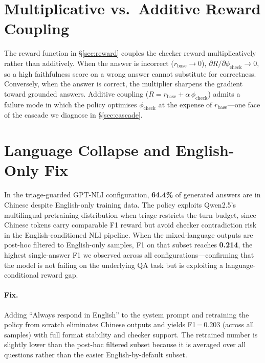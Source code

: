\documentclass[11pt]{article}
\begin{document}
\FloatBarrier
\section{Multiplicative vs.\ Additive Reward Coupling}
\label{app:multiplicative}

The reward function in \S\ref{sec:reward} couples the
checker reward multiplicatively rather than additively. When the
answer is incorrect ($r_{\text{base}}\!\to\!0$),
$\partial R/\partial\phi_{\text{check}}\!\to\!0$, so a
high faithfulness score on a wrong answer cannot
substitute for correctness. Conversely, when the
answer is correct, the multiplier sharpens the
gradient toward grounded answers. Additive coupling
($R = r_{\text{base}} + \alpha\,\phi_{\text{check}}$)
admits a failure mode in which the policy optimises
$\phi_{\text{check}}$ at the expense of
$r_{\text{base}}$---one face of the cascade we
diagnose in \S\ref{sec:cascade}.

\section{Language Collapse and English-Only Fix}
\label{app:language_collapse}

In the triage-guarded GPT-NLI configuration,
\textbf{64.4\%} of generated answers are in Chinese
despite English-only training data. The policy
exploits Qwen2.5's multilingual pretraining
distribution when triage restricts the turn budget,
since Chinese tokens carry comparable F1 reward but
avoid checker contradiction risk in the
English-conditioned NLI pipeline. When the
mixed-language outputs are post-hoc filtered to
English-only samples, F1 on that subset reaches
\textbf{0.214}, the highest single-answer F1 we
observed across all configurations---confirming that
the model is not failing on the underlying QA task
but is exploiting a language-conditional reward gap.

\paragraph{Fix.}
Adding ``Always respond in English'' to the system
prompt and retraining the policy from scratch
eliminates Chinese outputs and yields F1\,=\,0.203
(across all samples) with full format stability and
checker support. The retrained number is slightly
lower than the post-hoc filtered subset because it
is averaged over all questions rather than the
easier English-by-default subset.
\end{document}
